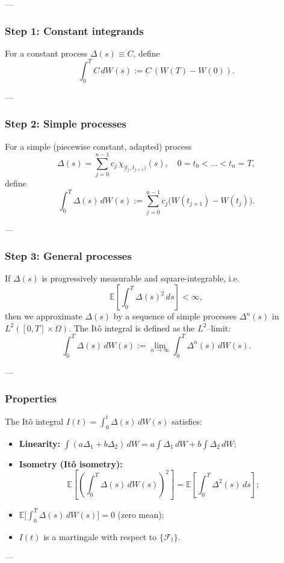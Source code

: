 \documentclass[12pt,a4paper]{book}
\theoremstyle{remark}
\newcommand{\EE}{\mathbb{E}}          %
\newcommand{\F}{\mathcal{F}}          %
\begin{document}
---

\subsubsection*{Step 1: Constant integrands}
For a constant process $\Delta(s) \equiv C$, define
\[
\int_0^T C\,dW(s) := C\,(W(T)-W(0)).
\]

---

\subsubsection*{Step 2: Simple processes}
For a simple (piecewise constant, adapted) process
\[
\Delta(s) = \sum_{j=0}^{n-1} c_j \,\chi_{[t_j,t_{j+1})}(s), \quad 0=t_0<\dots<t_n=T,
\]
define
\[
\int_0^T \Delta(s)\,dW(s) := \sum_{j=0}^{n-1} c_j \big(W(t_{j+1})-W(t_j)\big).
\]

---

\subsubsection*{Step 3: General processes}
If $\Delta(s)$ is progressively measurable and square-integrable, i.e.
\[
\EE\!\left[\int_0^T \Delta(s)^2 \,ds\right] < \infty,
\]
then we approximate $\Delta(s)$ by a sequence of simple processes $\Delta^n(s)$ in $L^2([0,T]\times\Omega)$.  
The Itô integral is defined as the $L^2$–limit:
\[
\int_0^T \Delta(s)\,dW(s) := \lim_{n\to\infty} \int_0^T \Delta^n(s)\,dW(s).
\]

---

\subsubsection*{Properties}
The Itô integral $I(t)=\int_0^t \Delta(s)\,dW(s)$ satisfies:
\begin{itemize}
    \item \textbf{Linearity:} $\int (a\Delta_1+b\Delta_2)\,dW = a\int\Delta_1\,dW + b\int\Delta_2\,dW$;
    \item \textbf{Isometry (Itô isometry):}
    \[
    \EE\!\left[\left(\int_0^T \Delta(s)\,dW(s)\right)^2\right] = \EE\!\left[\int_0^T \Delta^2(s)\,ds\right];
    \]
    \item $\EE\!\big[\int_0^T \Delta(s)\,dW(s)\big] = 0$ (zero mean);
    \item $I(t)$ is a martingale with respect to $\{\F_t\}$.
\end{itemize}

---
\end{document}
